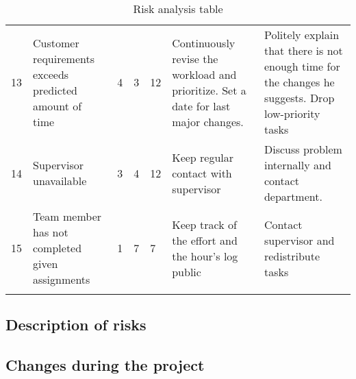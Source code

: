 \begin{longtable}{|p{0.5cm}!{\vrule width -1pt}p{3.6cm}!{\vrule width -1pt}l!{\vrule width -1pt}l!{\vrule width -1pt}l!{\vrule width -1pt}p{4.4cm}!{\vrule width -1pt}p{4.4cm}|}
13&Customer requirements exceeds predicted amount of time& 4 & 3 & 12 & Continuously revise the workload and prioritize. Set a date for last major changes. & Politely explain that there is not enough time for the changes he suggests. Drop low-priority tasks\\
14&Supervisor unavailable & 3 & 4 & 12 & Keep regular contact with supervisor & Discuss problem internally and contact department.\\
15&Team member has not completed given assignments & 1 & 7 & 7 & Keep track of the effort and the hour's log public & Contact supervisor and redistribute tasks \\\hline
\caption{Risk analysis table}
\end{longtable}

\subsection{Description of risks}
\subsection{Changes during the project}
